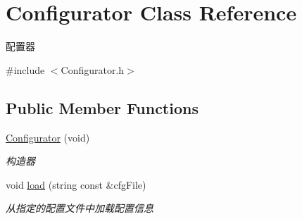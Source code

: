 \hypertarget{class_configurator}{}\section{Configurator Class Reference}
\label{class_configurator}


配置器  




{\ttfamily \#include $<$Configurator.\+h$>$}

\subsection*{Public Member Functions}
\begin{DoxyCompactItemize}
\item 
\mbox{\label{class_configurator_a8755c4fd8511b54067af1f1ac78ba18c}} 
\hyperlink{class_configurator_a8755c4fd8511b54067af1f1ac78ba18c}{Configurator} (void)
\begin{DoxyCompactList}\small\item\em 构造器 \end{DoxyCompactList}\item 
void \hyperlink{class_configurator_a5c8b62b3619de64a81b3877a4498f6d8}{load} (string const \&cfg\+File)
\begin{DoxyCompactList}\small\item\em 从指定的配置文件中加载配置信息 \end{DoxyCompactList}\end{DoxyCompactItemize}
